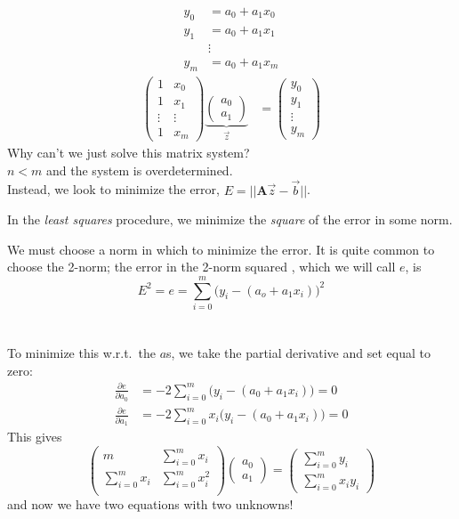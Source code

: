 \documentclass[12pt]{exam}
\newcommand{\ve}[1]{\ensuremath{\mathbf{#1}}}
\begin{document}
\begin{align}
y_0 &= a_0 + a_1 x_0 \nonumber \\
y_1 &= a_0 + a_1 x_1 \nonumber\\
& \vdots \nonumber\\
y_m &= a_0 + a_1 x_m \nonumber
%
\end{align}
\begin{align*}
\begin{pmatrix}
1 & x_0 \\ 1 & x_1 \\ \vdots & \vdots \\ 1 & x_m
\end{pmatrix}
\underbrace{\begin{pmatrix}
a_0 \\ a_1
\end{pmatrix}}_{\vec{z}} &=
\begin{pmatrix}
y_0 \\ y_1 \\ \vdots \\ y_m
\end{pmatrix}
\end{align*}
%
Why can't we just solve this matrix system?\\ $n < m$ and the system is overdetermined.\\ Instead, we look to minimize the error, $E = ||\ve{A}\vec{z} - \vec{b}||$.

In the \textit{least squares} procedure, we minimize the \textit{square} of the error in some norm. 

We must choose a norm in which to minimize the error. It is quite common to choose the 2-norm; the error in the 2-norm squared , which we will call $e$, is
\ifprintanswers
\[E^2 = e = \sum_{i=0}^m \bigl(y_i - (a_o + a_1 x_i)\bigr)^2\]
\else
\\ \vspace*{3em}\\
\fi
%
To minimize this w.r.t.\ the $a$s, we take the partial derivative and set equal to zero:
%
\begin{align}
\frac{\partial e}{\partial a_0} &= -2 \sum_{i=0}^m \bigl(y_i - (a_0 + a_1 x_i)\bigr) = 0 \nonumber\\
%
\frac{\partial e}{\partial a_1} &= -2 \sum_{i=0}^m x_i \bigl(y_i - (a_0 + a_1 x_i)\bigr) = 0 \nonumber
\end{align}
%
This gives
%
\begin{equation}
\begin{pmatrix}
m                & \sum_{i=0}^m x_i \nonumber\\
\sum_{i=0}^m x_i & \sum_{i=0}^m x_i^2 \nonumber\\ 
\end{pmatrix}
\begin{pmatrix}
a_0 \\ a_1
\end{pmatrix} =
\begin{pmatrix}
\sum_{i=0}^m y_i \\ \sum_{i=0}^m x_i y_i
\end{pmatrix}\nonumber
\end{equation}
%
and now we have two equations with two unknowns! 
\end{document}
